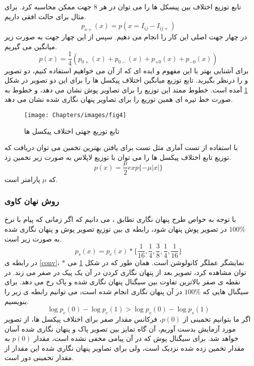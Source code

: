 تابع توزیع اختلاف بین پیسکل ها را می توان در هر 8 جهت ممکن محاسبه کرد. برای مثال برای حالت افقی داریم.
\begin{equation}
p_{o+}(x)=p(x=I_{ij}-I_{ij+})
\end{equation}
در چهار جهت اصلی این کار را انجام می دهیم. سپس از این چهار جهت به صورت زیر میانگین می گیریم.
\begin{equation}
p(x)=\frac{1}{4}(p_{0+}(x)+p_{0-}(x)+p_{+0}(x)+p_{-0}(x))
\end{equation}
برای آشنایی بهتر با این مفهوم و ایده ای که از آن می خواهیم استفاده کنیم، دو تصویر  و  را درنظر بگیرید. تابع توزیع میانگین اختلاف پیکسل ها را برای این دو تصویر در شکل \ref{diffFig} آمده است. خطوط ممتد این توزیع را برای تصاویر پوش نشان می دهد، و خطوط به صورت خط تیره ای همین توزیع را برای تصاویر پنهان نگاری شده نشان می دهد.
\begin{figure}[!htbp]
\centerline{\texttt{[image: Chapters/images/fig4]}}
\caption{تابع توزیع جهتی اختلاف پیکسل ها}
\label{diffFig}
\end{figure}
با استفاده از تست آماری مثل تست  برای یافتن بهترین تخمین می توان دریافت که توزیع تابع اختلاف پیکسل ها را می توان با توزیع لاپلاس به صورت زیر تخمین زد.
\begin{equation}
p(x)=\frac{\mu}{2}exp\lbrace -\mu |x|\rbrace
\end{equation}
که $ \mu $ پارامتر {} است. 
\subsubsection{روش نهان کاوی }
با توجه به خواص طرح پنهان نگاری تطابق ، می دانیم که اگر زمانی که پیام با نرخ {$ 100\% $} در تصویر پوش پنهان شود، رابطه ی بین توزیع تصویر پوش و پنهان نگاری شده به صورت زیر است.
\begin{equation}
\label{conv}
p_{s}(x)=p_{c}(x)* \lbrace \frac{1}{16},\frac{1}{4},\frac{3}{8},\frac{1}{4},\frac{1}{16}\rbrace
\end{equation}
در رابطه ی  {\ref{conv}}،  $ * $ نمایشگر عملگر کانولوشن است. همان طور که در شکل \ref{diffFig} می توان مشاهده کرد، تصویر بعد از پنهان نگاری کردن در آن یک پیک در صفر می زند. در نقطه ی صفر بالاترین تفاوت بین سیگنال پنهان نگاری شده و پاک رخ می دهد. برای سیگنال هایی که $ 100\% $ در آن پنهان نگاری انجام شده است، می توانیم رابطه ی زیر را بنویسیم.
\begin{equation}
\label{estimate01}
\log p_{c}(0)-\log p_{c}(1)>\log p_{s}(0)-\log p_{s}(1)
\end{equation}
اگر ما بتوانیم تخمینی از  $ p(0) $، فرکانس مقدار صفر برای اختلاف پیکسل ها، از تصویر مورد آزمایش بدست آوریم، آن گاه تمایز بین تصویر پاک و پنهان نگاری شده آسان خواهد شد. برای سیگنال پوش که در آن پیامی مخفی نشده است، مقدار $ p(0) $ به مقدار تخمین زده شده نزدیک است، ولی برای تصاویر پنهان نگاری شده این مقدار از مقدار تخمینی دور است. 

